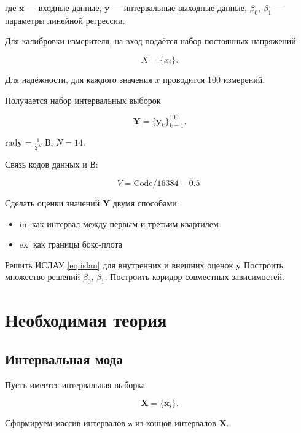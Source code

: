 \documentclass{article}
\begin{document}
  где \( \mathbf{x} \) --- входные данные, \( \mathbf{y} \) --- интервальные
  выходные данные, \( \beta_0 \), \( \beta_1 \) --- параметры линейной
  регрессии.

  Для калибровки измерителя, на вход подаётся набор постоянных
  напряжений

  \begin{equation}
    X = \{ x_i \}.
  \end{equation}

  Для надёжности, для каждого значения \( x \) проводится 100 измерений.

  Получается набор интервальных выборок

  \begin{equation}
    \mathbf{Y} = \{ \mathbf{y}_k \}_{k=1}^{100}.
  \end{equation}

  \( \text{rad} \mathbf{y} = \frac{1}{2^N} \) В, \( N = 14 \).

  Связь кодов данных и В:

  \begin{equation}
    V = \text{Code} / 16384 - 0.5.
  \end{equation}

  Сделать оценки значений \( \mathbf{Y} \) двумя способами:

  \begin{itemize}
    \item in: как интервал между первым и третьим квартилем
    \item ex: как границы бокс-плота
  \end{itemize}

  Решить ИСЛАУ \ref{eq:islau} для внутренних и внешних оценок
  \( \mathbf{y} \)
  Построить множество решений \( \beta_0 \), \( \beta_1 \).
  Построить коридор совместных зависимостей.

  \section{Необходимая теория}

  \subsection{Интервальная мода}

  Пусть имеется интервальная выборка

  \[
    \mathbf{X} = \{ \mathbf{x}_i \}.
  \]

  Сформируем массив интервалов \( \mathbf{z} \) из концов интервалов
  \( \mathbf{X} \).
\end{document}
